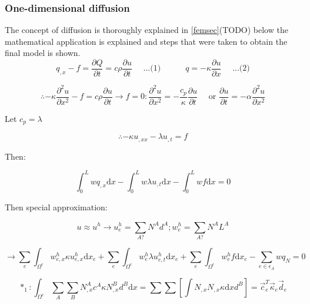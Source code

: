 	\subsubsection{One-dimensional diffusion}
The concept of diffusion is thoroughly explained in \ref{femsec}(TODO) below the mathematical application is explained and steps that were taken to obtain the final model is shown.
	\begin{equation}
	q_{,x} - f = \frac{\partial Q}{\partial t} = c\rho\frac{\partial u}{\partial t}\quad\text{  ...(1)} \quad\quad\quad q = -\kappa \frac{\partial u}{\partial x}\quad\text{  ...(2)}
\end{equation}



\begin{equation}
\therefore -\kappa \frac{\partial^2 u}{\partial x^2} - f = c\rho \frac{\partial u}{\partial t} \rightarrow f=0: \frac{\partial^2 u}{\partial x^2} = - \frac{c_p}{\kappa} \frac{\partial u}{\partial t} \quad \text{ or } \frac{\partial u}{\partial t} = -\alpha \frac{\partial^2 u}{\partial x^2}
\end{equation}


Let $c_p = \lambda$ 

\begin{equation}
\therefore -\kappa u_{,xx} - \lambda u_{,t} = f
\end{equation}


Then:

\begin{equation}
\int_0^L w q_{,x} \text{d}x - \int_0^L w \lambda u_{,t} \text{d}x - \int_0^L w f \text{d}x = 0
\end{equation}


Then special approximation:

\begin{equation}
u \approx u^h \rightarrow u_e^h = \sum_{A?}N^A d^A ; w_e^h = \sum_{A?}N^A L^A
\end{equation}


\begin{equation}
\rightarrow \sum_e \int_{\Omega^e} w_{e,x}^h \kappa u_{e,x}^h \text{d}x_e + \sum_e \int_{\Omega^e} w_e^h \lambda u_{e,t}^h \text{d}x_e + \sum_e \int_{\Omega^e} w_e^h f \text{d}x_e - \sum_{e \in \epsilon_A} w q_N = 0
\end{equation}


\begin{equation}
*_1: \int_{\Omega^e} \sum_A \sum_B N_{,x}^A c^A \kappa N_{,x}^B d^B \text{d}x = \sum\sum \left[ \int N_{,x} N_{,x} \kappa \text{d}x d^B\right] = \vec{c}_e^T \vec{\kappa}_e \vec{d}_e
\end{equation}


